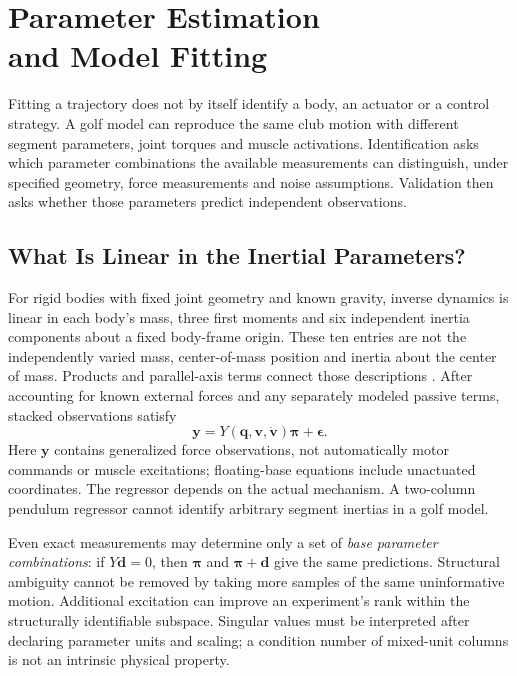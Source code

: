 \chapter[Parameter Estimation and Model Fitting]{Parameter Estimation\\and Model Fitting}
\label{ch:param-estimation}

Fitting a trajectory does not by itself identify a body, an actuator or a
control strategy. A golf model can reproduce the same club motion with different
segment parameters, joint torques and muscle activations. Identification asks
which parameter combinations the available measurements can distinguish, under
specified geometry, force measurements and noise assumptions. Validation then
asks whether those parameters predict independent observations.

\section{What Is Linear in the Inertial Parameters?}

For rigid bodies with fixed joint geometry and known gravity, inverse dynamics
is linear in each body's mass, three first moments and six independent inertia
components about a fixed body-frame origin. These ten entries are not the
independently varied mass, center-of-mass position and inertia about the center
of mass. Products and parallel-axis terms connect those descriptions
\cite{WensingPhysicalIdentificationReview,TedrakeSystemIdentificationReview}.
After accounting for known external forces and any separately modeled passive
terms, stacked observations satisfy
\begin{equation}
  \bm{y}=Y(\bm{q},\bm{v},\dot{\bm{v}})\bm{\pi}+\bm{\epsilon}.
\end{equation}
Here $\bm{y}$ contains generalized force observations, not automatically motor
commands or muscle excitations; floating-base equations include unactuated
coordinates. The regressor depends on the actual mechanism. A two-column
pendulum regressor cannot identify arbitrary segment inertias in a golf model.

Even exact measurements may determine only a set of \emph{base parameter
combinations}: if $Y\bm{d}=0$, then $\bm{\pi}$ and
$\bm{\pi}+\bm{d}$ give the same predictions. Structural ambiguity cannot be
removed by taking more samples of the same uninformative motion. Additional
excitation can improve an experiment's rank within the structurally identifiable
subspace. Singular values must be interpreted after declaring parameter units
and scaling; a condition number of mixed-unit columns is not an intrinsic
physical property.

